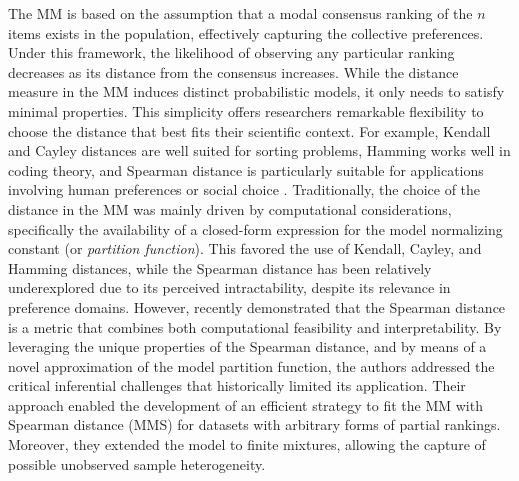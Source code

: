 The MM is based on the assumption that a modal consensus ranking of the $n$ items exists in the population, effectively capturing the collective preferences. Under this framework, the likelihood of observing any particular ranking decreases as its distance from the consensus increases. 
{While the distance measure in the MM induces distinct probabilistic models, it only needs to satisfy minimal properties. This simplicity offers researchers remarkable flexibility to choose the distance that best fits their scientific context. For example, Kendall and Cayley distances are well suited for sorting problems, Hamming works well in coding theory, and Spearman distance is particularly suitable for applications involving human preferences or social choice \citep{Diaconis1988}.} 
Traditionally, the choice of the distance in the MM was mainly driven by computational considerations, specifically the availability of a closed-form expression for the model normalizing constant (or \textit{partition function}). This favored the use of Kendall, Cayley, and Hamming distances, while the Spearman distance has been relatively underexplored due to its perceived intractability, despite its relevance in preference domains. However, \citet{crispino23efficient} recently demonstrated that the Spearman distance is a metric that combines both computational feasibility and interpretability. By leveraging the unique properties of the Spearman distance, and by means of a novel approximation of the model partition function, the authors addressed the critical inferential challenges that historically limited its application. Their approach enabled the development of an efficient strategy to fit the MM with Spearman distance (MMS) for datasets with arbitrary forms of partial rankings. Moreover, they extended the model to finite mixtures, allowing the capture of possible unobserved sample heterogeneity.

